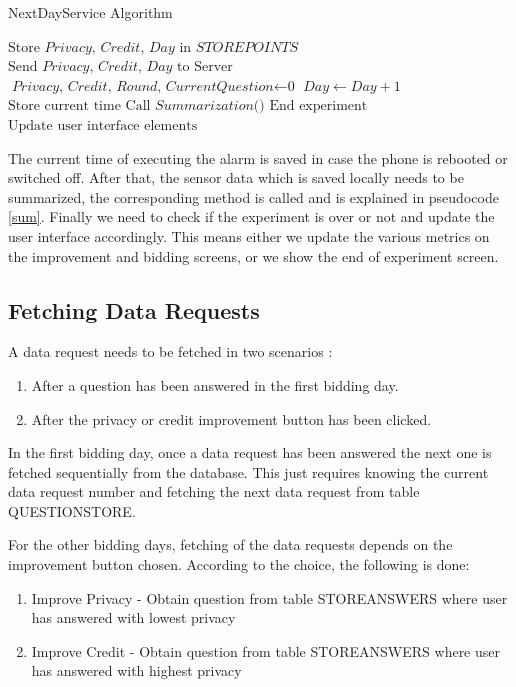 \begin{algorithm}
\caption{NextDayService Algorithm}\label{nextday}
\begin{algorithmic}[1]
\State $\text{Store }\textit{Privacy, Credit, Day } \text{in } \textit{STOREPOINTS}$
\State $\text{Send }\textit{Privacy, Credit, Day } \text{to Server}$
\State $\textit{Privacy, Credit, Round, CurrentQuestion} \gets \text{0}$
\State $\textit{Day} \gets \textit{Day}+1$
\State $\text{Store current time}$
\State $\text{Call }\textit{Summarization()}$
  \State $\text{End experiment}$
\Else
  \State $\text{Update user interface elements}$ 
\EndIf
\EndProcedure
\end{algorithmic}
\end{algorithm}

The current time of executing the alarm is saved in case the phone is rebooted or switched off. After that, the sensor data which is saved locally
needs to be summarized, the corresponding method is called and is explained in pseudocode \ref{sum}. Finally we need to check if the experiment is over or not and update the user interface accordingly. This means either we update the various metrics on the improvement and bidding screens, or we 
show the end of experiment screen.

\subsection{Fetching Data Requests} \label{data_req}
A data request needs to be fetched in two scenarios :

\begin{enumerate}
	\item After a question has been answered in the first bidding day.
	\item After the privacy or credit improvement button has been clicked.
\end{enumerate}

In the first bidding day, once a data request has been answered the next one is fetched sequentially from the database. This just requires knowing the current data request number and fetching the next data request from table QUESTIONSTORE. 

For the other bidding days, fetching of the data requests depends on the improvement button chosen. According to the choice, the following is done:

\begin{enumerate}
	\item Improve Privacy - Obtain question from table STOREANSWERS where user has answered with lowest privacy
	\item Improve Credit - Obtain question from table STOREANSWERS where user has answered with highest privacy
\end{enumerate}

